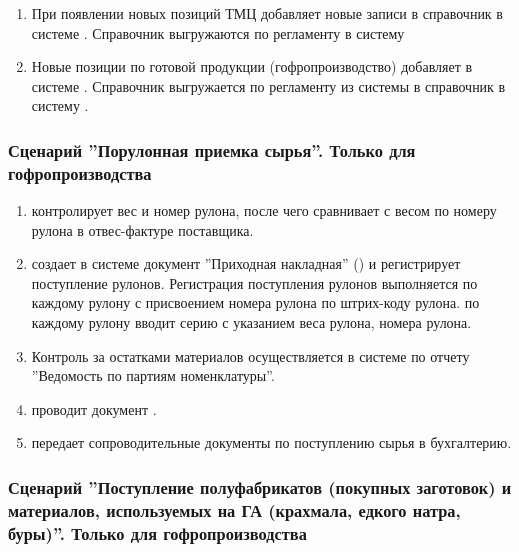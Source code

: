 \begin{enumerate}
\item При появлении новых позиций ТМЦ \kladovshik  добавляет новые записи в справочник  в системе \gofro. Справочник выгружаются по регламенту в систему \erp 
\item Новые позиции по готовой продукции (гофропроизводство) добавляет \manager в системе \gofro. Справочник выгружается по регламенту из системы \gofro в справочник  в систему \unf.
\end{enumerate}



\subsubsection{Сценарий ''Порулонная приемка сырья''. Только для гофропроизводства}
\label{bp:storage_5}

\begin{enumerate}
\item \kladovshik контролирует вес и номер рулона, после чего сравнивает с весом по номеру рулона в отвес-фактуре поставщика.

\item \kladovshik создает в системе \gofro документ ”Приходная накладная” ()
и регистрирует поступление рулонов.
Регистрация поступления рулонов выполняется по каждому рулону с присвоением номера рулона по штрих-коду рулона.
\kladovshik по каждому рулону  вводит серию с указанием веса рулона, номера рулона. 

\item Контроль за остатками материалов осуществляется в системе \gofro по отчету ”Ведомость по партиям номенклатуры”.

\item \kladovshik проводит документ .
\item \kladovshik передает сопроводительные документы по поступлению сырья в бухгалтерию.


\end{enumerate}


\subsubsection{Сценарий ''Поступление полуфабрикатов (покупных заготовок) и материалов, используемых на ГА (крахмала, едкого натра, буры)''. Только для гофропроизводства}
\label{bp:storage_51}

